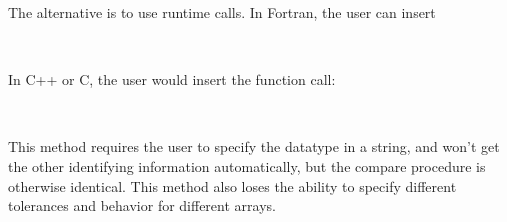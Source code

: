 The alternative is to use runtime calls.
In Fortran, the user can insert
\begin{otabbing}
\> \\
\>
\end{otabbing}
In C++ or C, the user would insert the function call:
\begin{otabbing}
\> \\
\>
\end{otabbing}
This method requires the user to specify the datatype in a string, and won't get the other identifying information automatically, but the compare procedure is otherwise identical.
This method also loses the ability to specify different tolerances and behavior for different arrays.


